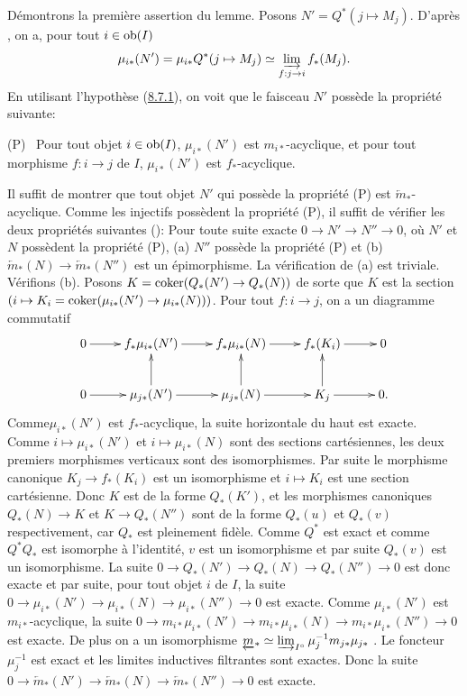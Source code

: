 \documentclass[10pt]{../fichiers-configuration-latex/smfart}
\begin{document}
Démontrons la première assertion du lemme. Posons $N' = Q^{\ast} (j
\mapsto M_j)$. D'après , on a, pour tout $i \in \operatorname{ob}(I)$
$$
\mu_{i\ast}(N') = \mu_{i\ast} Q^{\ast} (j \mapsto M_j) \simeq
\varinjlim_{f : j \to i} f_{\ast} (M_j){\quoi}.
$$
En utilisant l'hypothèse (\hyperref[VI.subsubsec8.7.1]{8.7.1}), on voit que le
faisceau $N'$ possède
la propriété suivante:

(P)~ Pour tout objet $i \in \operatorname{ob} (I)$, $\mu_{i\ast}(N')$ est
$m_{i\ast}$-acyclique, et pour tout morphisme $f : i \to j$ de $I$,
$\mu_{i \ast} (N')$ est $f_{\ast}$-acyclique.

Il suffit de montrer que tout objet $N'$ qui possède la propriété
(P) est $\underleftarrow{m}_{\ast}$-acyclique. Comme les injectifs
possèdent la propriété (P), il suffit de vérifier les deux
propriétés suivantes (): Pour toute suite exacte $0
\to N' \to N'' \to 0$, où $N'$ et $N$ possèdent la propriété
(P), (a) $N''$ possède la propriété (P) et (b) $\underleftarrow{m}_{\ast} (N) \to
\underleftarrow{m}_{\ast} (N'')$ est un épimorphisme. La vérification de (a) est
triviale. Vérifions (b). Posons $K = \coker (Q_{\ast}(N') \to
Q_{\ast} (N))$ de sorte que $K$ est la section $(i \mapsto K_i =
\coker (\mu_{i\ast} (N') \to \mu_{i\ast} (N)))$. Pour tout $f : i
\to j$, on a un diagramme commutatif
\[
\xymatrix{
0  \ar[r] & f_{\ast}\mu_{i\ast}(N') \ar[r] & f_{\ast}\mu_{i\ast}(N)\ar[r]
 & f_{\ast}(K_i) \ar[r]& 0\\
0  \ar[r] & \mu_{j\ast}(N')\ar[u] \ar[r] & \mu_{j\ast}(N) \ar[u] \ar[r] & K_j
\ar[r] \ar[u]&0.
}
\]
Comme\pageoriginale $\mu_{i \ast}(N')$ est $f_{\ast}$-acyclique, la
suite horizontale du haut est exacte. Comme $i \mapsto \mu_{i\ast}
(N')$ et $i \mapsto \mu_{i\ast} (N)$ sont des sections cartésiennes,
les deux premiers morphismes verticaux sont des isomorphismes. Par
suite le morphisme canonique $K_j \to f_{\ast} (K_i)$ est un
isomorphisme et $i \mapsto K_i$ est une section cartésienne. Donc
$K$ est de la forme $Q_{\ast} (K')$, et les morphismes canoniques
$Q_{\ast}(N) \to K$ et $K \to Q_{\ast}(N'')$ sont de la forme
$Q_{\ast}(u)$ et $Q_{\ast}(v)$ respectivement, car $Q_{\ast}$ est
pleinement fidèle. Comme $Q^{\ast}$ est exact et comme
$Q^{\ast}Q_{\ast}$ est isomorphe à l'identité, $v$ est un
isomorphisme et par suite $Q_{\ast}(v)$ est un isomorphisme. La
suite $0 \to Q_{\ast} (N') \to Q_{\ast}(N) \to Q_{\ast}(N'') \to 0$
est donc exacte et par suite, pour tout objet $i$ de $I$, la suite
$0 \to \mu_{i\ast}(N') \to \mu_{i\ast}(N) \to \mu_{i\ast}(N'') \to
0$ est exacte. Comme $\mu_{i\ast}(N')$ est $m_{i\ast}$-acyclique, la
suite $0 \to m_{i\ast} \mu_{i\ast} (N') \to m_{i\ast} \mu_{i\ast}
(N) \to m_{i\ast} \mu_{i\ast} (N'') \to 0$ est exacte. De plus on a
un isomorphisme $\underleftarrow{m}_{\ast} \simeq
\varinjlim_{I^{\circ}} \mu^{-1}_j m_{j\ast} \mu_{j\ast}$
. Le foncteur $\mu^{-1}_j$ est exact et les limites
inductives filtrantes sont exactes. Donc la suite $0 \to
\underleftarrow{m}_{\ast}(N') \to \underleftarrow{m}_{\ast}(N) \to
\underleftarrow{m}_{\ast}(N'') \to 0$ est exacte.
\end{document}
